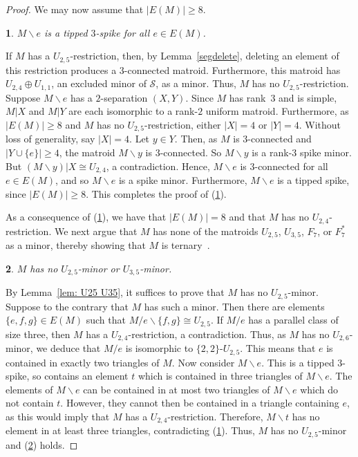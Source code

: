 \documentclass[11pt]{amsart}
\newtheorem{sublemma}{}[theorem]
\numberwithin{equation}{section} %
\newcommand{\cS}{\mathcal{S}}
\begin{document}
\begin{proof}
We may now assume that $|E(M)|\geq 8$.

\begin{sublemma}
\label{sublem: 3con rk3 a}
$M\backslash e$ is a tipped $3$-spike for all $e\in E(M)$.
\end{sublemma}

If $M$ has a $U_{2,5}$-restriction, then, by Lemma~\ref{segdelete}, deleting an element of this restriction produces a $3$-connected matroid. Furthermore, this matroid has $U_{2, 4}\oplus U_{1, 1}$, an excluded minor of $\cS$, as a minor. Thus, $M$ has no $U_{2,5}$-restriction. Suppose $M\backslash e$ has a $2$-separation $(X, Y)$. Since $M$ has rank~$3$ and is simple, $M|X$ and $M|Y$ are each isomorphic to a rank-$2$ uniform matroid. Furthermore, as $|E(M)|\geq 8$ and $M$ has no $U_{2, 5}$-restriction, either $|X|=4$ or $|Y|=4$. Without loss of generality, say $|X|=4$. Let $y\in Y$. Then, as $M$ is $3$-connected and $|Y\cup \{e\}|\ge 4$, the matroid $M\backslash y$ is $3$-connected. So $M\backslash y$ is a rank-$3$ spike minor. But $(M\backslash y)|X\cong U_{2, 4}$, a contradiction. Hence, $M\backslash e$ is $3$-connected for all $e\in E(M)$, and so $M \backslash e$ is a spike minor. Furthermore, $M \backslash e$ is a tipped spike, since $|E(M)| \geq 8$. This completes the proof of (\ref{sublem: 3con rk3 a}).

As a consequence of (\ref{sublem: 3con rk3 a}), we have that $|E(M)|=8$ and that $M$ has no $U_{2, 4}$-restriction. We next argue that $M$ has none of the matroids $U_{2, 5}$, $U_{3, 5}$, $F_7$, or $F_7^*$ as a minor, thereby showing that $M$ is ternary~\cite{bix79, sey79}.

\begin{sublemma}
\label{sublem: rk3 no U25}
$M$ has no $U_{2, 5}$-minor or $U_{3, 5}$-minor.
\end{sublemma}

By Lemma~\ref{lem: U25 U35}, it suffices to prove that $M$ has no $U_{2,5}$-minor. Suppose to the contrary that $M$ has such a minor. Then there are elements $\{e, f, g\}\in E(M)$ such that $M/e\backslash\{f, g\}\cong U_{2, 5}$. If $M/e$ has a parallel class of size three, then $M$ has a $U_{2, 4}$-restriction, a contradiction. Thus, as $M$ has no $U_{2, 6}$-minor, we deduce that $M/e$ is isomorphic to $\{2, 2\}$-$U_{2, 5}$. This means that $e$ is contained in exactly two triangles of $M$. Now consider $M \backslash e$. This is a tipped $3$-spike, so contains an element $t$ which is contained in three triangles of $M \backslash e$. The elements of $M \backslash e$ can be contained in at most two triangles of $M \backslash e$ which do not contain $t$. However, they cannot then be contained in a triangle containing $e$, as this would imply that $M$ has a $U_{2,4}$-restriction. Therefore, $M\backslash t$ has no element in at least three triangles, contradicting (\ref{sublem: 3con rk3 a}). Thus, $M$ has no $U_{2, 5}$-minor and (\ref{sublem: rk3 no U25}) holds.


\end{proof}
\end{document}
